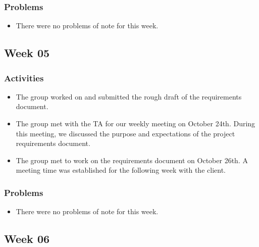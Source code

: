 \documentclass[letterpaper, onecolumn, draftclsnofoot, 10pt, compsoc]{IEEEtran}
\begin{document}
\begin{singlespace}
        \subsubsection{Problems}
        	\begin{itemize}
        	\item There were no problems of note for this week.
        	\end{itemize}
        
    \subsection{Week 05}
    	\subsubsection{Activities}
        	\begin{itemize}
        	\item The group worked on and submitted the rough draft of the requirements document.
            \item The group met with the TA for our weekly meeting on October 24th. During this meeting, we discussed the purpose and expectations of the project requirements document. 
            \item The group met to work on the requirements document on October 26th. A meeting time was established for the following week with the client.
        	\end{itemize}
        \subsubsection{Problems}
        	\begin{itemize}
        	\item There were no problems of note for this week.
        	\end{itemize}
        
    \subsection{Week 06}

\end{singlespace}
\end{document}
